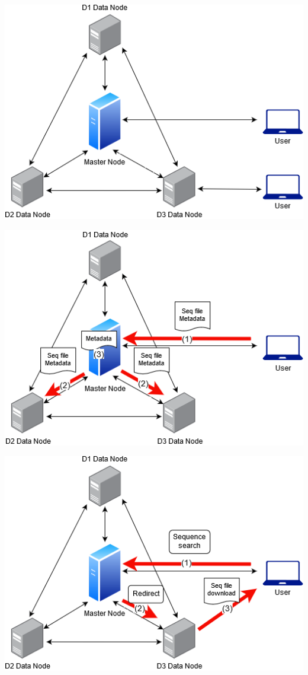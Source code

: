 \documentclass[acmsmall]{acmart}
\newenvironment{Figure}
  {\par\medskip\noindent\minipage{\linewidth}}
  {\endminipage\par\medskip}
\begin{document}
\begin{multicols}{2}
\begin{Figure}
\centering
\includegraphics[width=0.8\linewidth]{images/thesis1.png} 
\end{Figure}

\begin{Figure}
\centering
\includegraphics[width=0.80\linewidth]{images/thesis1-Page-3.png} 
\end{Figure}

\begin{Figure}
\centering
\includegraphics[width=0.80\linewidth]{images/thesis4.png} 
\end{Figure}


\end{multicols}
\end{document}
